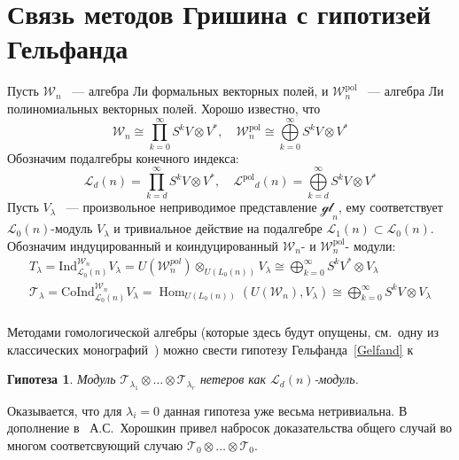 \documentclass[12pt,a4paper]{article}
\newtheorem{conjecture}{Гипотеза}[section]
\newcommand{\Wpn}{\ensuremath{\mathcal{W}^{\mathrm{pol}}_n}}
\newcommand{\Wn}{\ensuremath{\mathcal{W}_n}}
\newcommand{\Lp}{\ensuremath{\mathcal{L}^{\mathrm{pol}}}}
\renewcommand{\L}{\ensuremath{\mathcal{L}}}
\begin{document}
    \section{Связь методов Гришина с гипотизей Гельфанда}
    Пусть $\Wn$ ~--- алгебра Ли формальных векторных полей, и $\Wpn$ ~--- алгебра Ли полиномиальных векторных полей.
    Хорошо известно, что
    \[
        \Wn \cong \prod\limits_{k=0}^{\infty} S^k V\otimes V^*, \quad \Wpn \cong \bigoplus\limits_{k=0}^{\infty} S^k V\otimes V^*
    \]
    Обозначим подалгебры конечного индекса:
    \[
        \L_d(n) = \prod\limits_{k=d}^{\infty} S^k V\otimes V^*, \quad \Lp_d(n) = \bigoplus\limits_{k=d}^{\infty} S^k V\otimes V^*
    \]
    Пусть $V_{\lambda}$ ~--- произвольное неприводимое представление $\mathcal{gl}_n$, ему соответствует $\L_0(n)$-модуль $V_{\lambda}$ и тривиальное действие на подалгебре $\L_1(n)\subset\L_0(n)$.
    Обозначим индуцированный и коиндуцированный $\Wn$- и $\Wpn$- модули:
    \begin{gather*}
        T_{\lambda} = \mathrm{Ind}^{\Wn}_{\L_0(n)} V_{\lambda} =  U(\mathcal{W}_n^{pol}) \otimes_{U(L_0(n))} V_{\lambda} \cong \bigoplus_{k=0}^{\infty} S^k V^* \otimes V_{\lambda} \\
        \mathcal{T}_{\lambda} = \mathrm{CoInd}^{\Wn}_{\L_0(n)} V_{\lambda} = \operatorname{Hom}_{U(L_0(n))}(U(\mathcal{W}_n), V_{\lambda}) \cong \bigoplus_{k=0}^{\infty} S^k V \otimes V_{\lambda}\\
    \end{gather*}

    Методами гомологической алгебры (которые здесь будут опущены, см.\ одну из классических монографий~\cite{Fuks}) можно свести гипотезу Гельфанда~\ref{Gelfand} к

    \vskip 0.1in\noindent
    \begin{conjecture}
        Модуль $\mathcal{T}_{\lambda_1}\otimes\ldots\otimes\mathcal{T}_{\lambda_r}$ нетеров как $\L_d(n)$-модуль.
    \end{conjecture}
    \vskip 0.1in\noindent

    Оказывается, что для $\lambda_i=0$ данная гипотеза уже весьма нетривиальна.
    В дополнение в~\cite{Feigin-Kanel-Khoroshkin} А.С.\ Хорошкин привел набросок доказательства общего случай во многом соответсвующий случаю $\mathcal{T}_{0}\otimes\ldots\otimes\mathcal{T}_{0}$.


    \printbibliography
\end{document}
